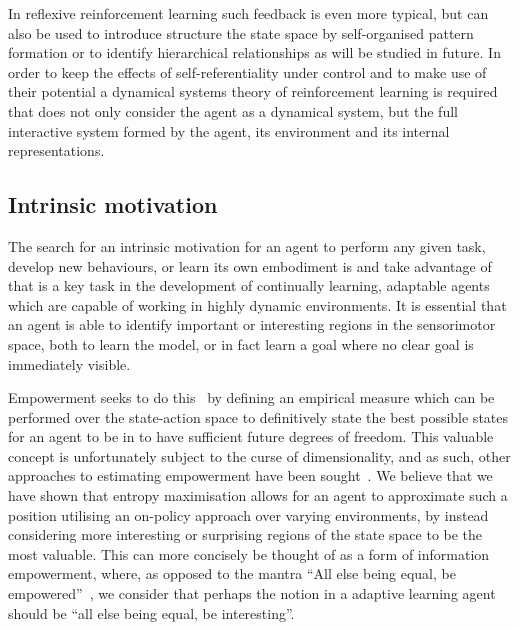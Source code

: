 \documentclass{article}
\begin{document}
In reflexive reinforcement learning such 
feedback is even more typical, but can also be used to introduce structure the 
state space by self-organised pattern formation or to identify hierarchical 
relationships as will be studied in future. In order to keep the effects of 
self-referentiality under control and to make use of their potential
a dynamical systems theory of reinforcement learning is required that 
does not only consider the agent as a dynamical system, but the full interactive 
system formed by the agent, its environment and its internal representations.

\subsection{Intrinsic motivation}
The search for an intrinsic motivation for an agent to perform any given task, develop new behaviours, or learn its own embodiment is and take advantage of that is a key task in the development of continually learning, adaptable agents which are capable of working in highly dynamic environments. It is essential that an agent is able to identify important or interesting regions in the sensorimotor space, both to learn the model, or in fact learn a goal where no clear goal is immediately visible. 

Empowerment seeks to do this~\citep{salge2014empowerment} by defining an empirical measure which can be performed over the state-action space to definitively state the best possible states for an agent to be in to have sufficient future degrees of freedom. This valuable concept is unfortunately subject to the curse of dimensionality, and as such, other approaches to estimating empowerment have been sought~\citep{zhao2019learning}. We believe that we have shown that entropy maximisation allows for an agent to approximate such a position utilising an on-policy approach over varying environments, by instead considering more interesting or surprising regions of the state space to be the most valuable.
This can more concisely be thought of as a form of information empowerment, where, as opposed to the mantra ``All else being equal, be empowered''~\citep{klyubin2005all}, we consider that perhaps the notion in a adaptive learning agent should be ``all else being equal, be interesting''.



\end{document}
